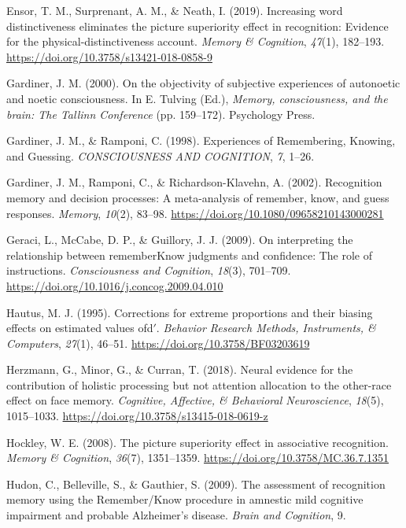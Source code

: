 \documentclass[
  11pt,
]{article}
\begin{document}
\leavevmode\hypertarget{ref-ensor2019b}{}%
Ensor, T. M., Surprenant, A. M., \& Neath, I. (2019). Increasing word
distinctiveness eliminates the picture superiority effect in
recognition: Evidence for the physical-distinctiveness account.
\emph{Memory \& Cognition}, \emph{47}(1), 182--193.
\url{https://doi.org/10.3758/s13421-018-0858-9}

\leavevmode\hypertarget{ref-gardiner2000}{}%
Gardiner, J. M. (2000). On the objectivity of subjective experiences of
autonoetic and noetic consciousness. In E. Tulving (Ed.), \emph{Memory,
consciousness, and the brain: The Tallinn Conference} (pp. 159--172).
Psychology Press.

\leavevmode\hypertarget{ref-gardiner1998}{}%
Gardiner, J. M., \& Ramponi, C. (1998). Experiences of Remembering,
Knowing, and Guessing. \emph{CONSCIOUSNESS AND COGNITION}, \emph{7},
1--26.

\leavevmode\hypertarget{ref-gardiner2002}{}%
Gardiner, J. M., Ramponi, C., \& Richardson-Klavehn, A. (2002).
Recognition memory and decision processes: A meta-analysis of remember,
know, and guess responses. \emph{Memory}, \emph{10}(2), 83--98.
\url{https://doi.org/10.1080/09658210143000281}

\leavevmode\hypertarget{ref-geraci2009}{}%
Geraci, L., McCabe, D. P., \& Guillory, J. J. (2009). On interpreting
the relationship between rememberKnow judgments and confidence: The role
of instructions. \emph{Consciousness and Cognition}, \emph{18}(3),
701--709. \url{https://doi.org/10.1016/j.concog.2009.04.010}

\leavevmode\hypertarget{ref-hautus1995}{}%
Hautus, M. J. (1995). Corrections for extreme proportions and their
biasing effects on estimated values ofd\({'}\). \emph{Behavior Research
Methods, Instruments, \& Computers}, \emph{27}(1), 46--51.
\url{https://doi.org/10.3758/BF03203619}

\leavevmode\hypertarget{ref-herzmann2018}{}%
Herzmann, G., Minor, G., \& Curran, T. (2018). Neural evidence for the
contribution of holistic processing but not attention allocation to the
other-race effect on face memory. \emph{Cognitive, Affective, \&
Behavioral Neuroscience}, \emph{18}(5), 1015--1033.
\url{https://doi.org/10.3758/s13415-018-0619-z}

\leavevmode\hypertarget{ref-hockley2008}{}%
Hockley, W. E. (2008). The picture superiority effect in associative
recognition. \emph{Memory \& Cognition}, \emph{36}(7), 1351--1359.
\url{https://doi.org/10.3758/MC.36.7.1351}

\leavevmode\hypertarget{ref-hudon2009}{}%
Hudon, C., Belleville, S., \& Gauthier, S. (2009). The assessment of
recognition memory using the Remember/Know procedure in amnestic mild
cognitive impairment and probable Alzheimer's disease. \emph{Brain and
Cognition}, 9.
\end{document}
